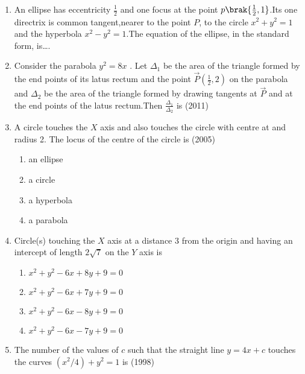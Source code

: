 \begin{enumerate}
    \item An ellipse has eccentricity $\frac{1}{2}$ and one focus at the point $p\brak{\frac{1}{2},1}$.Its one directrix is common tangent,nearer to the point $P$, to the circle $x^2+y^2=1$ and the hyperbola $x^2-y^2=1$.The equation of the ellipse, in the standard form, is\dots.
    \hfill{} 
\item Consider the parabola $y^2=8x$ . Let $\Delta_1$ be the area of the triangle formed by the end points of its latus rectum and the point $\Vec{P}$$(\frac{1}{2},2)$ on the parabola and $\Delta_2$ be the area of the triangle formed by drawing tangents at $\Vec{P}$ and at the end points of the latus rectum.Then $\frac{\Delta_1}{\Delta_2}$ is 
\hfill(2011)
\item A circle touches the $X$ axis and also touches the circle with centre at  and radius 2. The locus of the centre of the circle is
\hfill{(2005)}
\begin{multicols}{2}
\begin{multicols}{2}
\begin{enumerate}
\item an ellipse
\item a circle 
\item a hyperbola
\item a parabola
\end{enumerate}
\end{multicols}
\end{multicols}
\item Circle(s) touching the $X$ axis at a distance 3 from the origin and having an intercept of length $2\sqrt{7}$ on the $Y$ axis is 
%
\hfill{}
\begin{multicols}{2}
\begin{multicols}{2}
\begin{enumerate}
\item $x^2 + y^2 - 6x + 8y + 9 = 0$
\item $x^2 + y^2 - 6x + 7y + 9 = 0$
\item $x^2 + y^2 - 6x - 8y + 9 = 0$
\item $x^2 + y^2 - 6x - 7y + 9 = 0$
\end{enumerate}
\end{multicols}
\end{multicols}
    \item The number of the values of $c$ such that the straight line $y=4x+c$ touches the curves $(x^2/4)+y^2=1$ is \hfill(1998)\\
	\begin{multicols}{2}

\end{multicols}$$
\end{enumerate}
